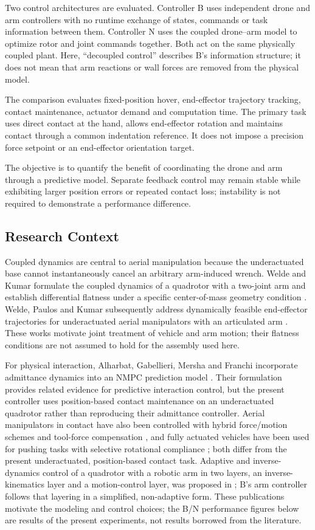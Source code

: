 \documentclass[conference]{IEEEtran}
\begin{document}
Two control architectures are evaluated. Controller B uses independent drone and arm controllers with no runtime exchange of states, commands or task information between them. Controller N uses the coupled drone--arm model to optimize rotor and joint commands together. Both act on the same physically coupled plant. Here, ``decoupled control'' describes B's information structure; it does not mean that arm reactions or wall forces are removed from the physical model.

The comparison evaluates fixed-position hover, end-effector trajectory tracking, contact maintenance, actuator demand and computation time. The primary task uses direct contact at the hand, allows end-effector rotation and maintains contact through a common indentation reference. It does not impose a precision force setpoint or an end-effector orientation target.

The objective is to quantify the benefit of coordinating the drone and arm through a predictive model. Separate feedback control may remain stable while exhibiting larger position errors or repeated contact loss; instability is not required to demonstrate a performance difference.

\subsection{Research Context}
Coupled dynamics are central to aerial manipulation because the underactuated base cannot instantaneously cancel an arbitrary arm-induced wrench. Welde and Kumar formulate the coupled dynamics of a quadrotor with a two-joint arm and establish differential flatness under a specific center-of-mass geometry condition \cite{welde2020}. Welde, Paulos and Kumar subsequently address dynamically feasible end-effector trajectories for underactuated aerial manipulators with an articulated arm \cite{welde2021}. These works motivate joint treatment of vehicle and arm motion; their flatness conditions are not assumed to hold for the assembly used here.

For physical interaction, Alharbat, Gabellieri, Mersha and Franchi incorporate admittance dynamics into an NMPC prediction model \cite{alharbat2025}. Their formulation provides related evidence for predictive interaction control, but the present controller uses position-based contact maintenance on an underactuated quadrotor rather than reproducing their admittance controller. Aerial manipulators in contact have also been controlled with hybrid force/motion schemes and tool-force compensation \cite{malczyk2023}, and fully actuated vehicles have been used for pushing tasks with selective rotational compliance \cite{hui2024}; both differ from the present underactuated, position-based contact task. Adaptive and inverse-dynamics control of a quadrotor with a robotic arm in two layers, an inverse-kinematics layer and a motion-control layer, was proposed in \cite{caccavale2014}; B's arm controller follows that layering in a simplified, non-adaptive form. These publications motivate the modeling and control choices; the B/N performance figures below are results of the present experiments, not results borrowed from the literature.
\end{document}
